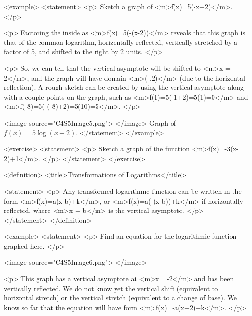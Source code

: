         <example>
            <statement>
                <p>
                    Sketch a graph of <m>f(x)=5\log(-x+2)</m>.
                </p>

                <p>
                    Factoring the inside as <m>f(x)=5\log(-(x-2))</m> reveals that this graph is that of the common logarithm, horizontally reflected, vertically stretched by a factor of 5, and shifted to the right by 2 units.
                </p>

                <p>
                    So, we can tell that the vertical asymptote will be shifted to <m>x = 2</m>, and the graph will have domain <m>(-\infty,2)</m> (due to the horizontal reflection).
                    A rough sketch can be created by using the vertical asymptote along with a couple points on the graph, such as <m>f(1)=5\log(-1+2)=5\log(1)=0</m> and <m>f(-8)=5\log(-(-8)+2)=5\log(10)=5</m>.
                </p>

                <image source="C4S5Image5.png">
                </image>
                Graph of $f(x)=5\log(x+2)$.
            </statement>
        </example>

        <exercise>
            <statement>
                <p>
                    Sketch a graph of the function <m>f(x)=-3\log(x-2)+1</m>.
                </p>
            </statement>
        </exercise>

        <definition>
            <title>Transformations of Logarithms</title>

            <statement>
                <p>
                    Any transformed logarithmic function can be written in the form <m>f(x)=a\log(x-b)+k</m>, or <m>f(x)=a\log(-(x-b))+k</m> if horizontally reflected, where <m>x = b</m> is the vertical asymptote.
                </p>
            </statement>
        </definition>

        <example>
            <statement>
                <p>
                    Find an equation for the logarithmic function graphed here.
                </p>

                <image source="C4S5Image6.png">
                </image>

                <p>
                    This graph has a vertical asymptote at <m>x =-2</m> and has been vertically reflected.
                    We do not know yet the vertical shift (equivalent to horizontal stretch) or the vertical stretch (equivalent to a change of base).
                    We know so far that the equation will have form <m>f(x)=-a\log(x+2)+k</m>.
                </p>

